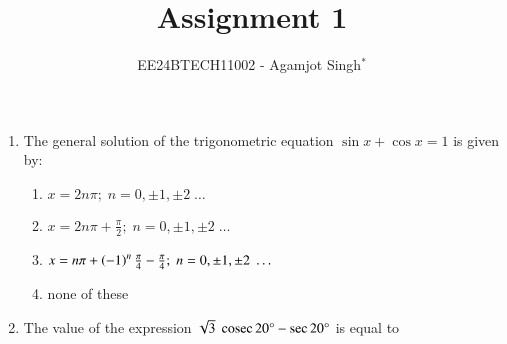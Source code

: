 \documentclass[journal,12pt,twocolumn]{IEEEtran}
\theoremstyle{remark}
\begin{document}

\title{Assignment 1}
\author{EE24BTECH11002 - Agamjot Singh$^{*}$%
}
\maketitle
\newpage
\bigskip

\begin{enumerate}
\section*{ C. MCQs with One Correct Answer}
    \setcounter{enumi}{4}

    \item The general solution of the trigonometric equation $\sin {x} + \cos{x} = 1$ is given by:
        
        \hfill{}
        \begin{enumerate}[label={(\alph*)}]
            \item $x = 2n\pi;\;n = 0,\pm1,\pm2\;\dots$
            \item $x = 2n\pi+\frac{\pi}{2};\;n = 0,\pm1,\pm2\;\dots$
            \item $x = n\pi+\left(-1\right)^n\frac{\pi}{4}-\frac{\pi}{4};\;n = 0,\pm1,\pm2\;\dots$
            \item none of these
        \end{enumerate}

    \item The value of the expression $\sqrt{3}\;\,\text{cosec}\,{20\degree}-\sec{20\degree}$ is equal to
        
        \hfill{}
        \begin{enumerate}[label={(\alph*)}]
        \end{enumerate}
        

\end{enumerate}
\end{document}
